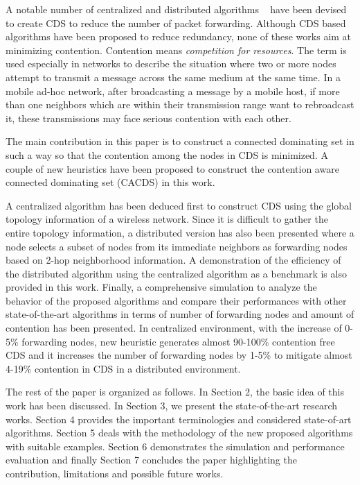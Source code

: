  A notable number of centralized and distributed algorithms ~\cite{yang2017routing, butenko2004new, luo2017new} have been devised to create CDS to reduce the number of packet forwarding. Although CDS based algorithms have been proposed to reduce redundancy, none of these works aim at minimizing contention. Contention means \textit{competition for resources}. The term is used especially in networks to describe the situation where two or more nodes attempt to transmit a message across the same medium at the same time. In a mobile ad-hoc network, after broadcasting a message by a mobile host, if more than one neighbors which are within their transmission range want to rebroadcast it, these transmissions may face serious contention with each other.
 
 The main contribution in this paper is to construct a connected dominating set in such a way so that the contention among the nodes in CDS is minimized. A couple of new heuristics have been proposed to construct the contention aware connected dominating set (CACDS) in this work. 
 
 A centralized algorithm has been deduced first to construct CDS using the global topology information of a wireless network. Since it is difficult to gather the entire topology information, a distributed version has also been presented where a node selects a subset of nodes from its immediate neighbors as forwarding nodes based on 2-hop neighborhood information. A demonstration of the efficiency of the distributed algorithm using the centralized algorithm as a benchmark is also provided in this work. Finally, a comprehensive simulation to analyze the behavior of the proposed algorithms and compare their performances with other state-of-the-art algorithms in terms of number of forwarding nodes and amount of contention has been presented. In centralized environment, with the increase of 0-5\% forwarding nodes, new heuristic generates almost 90-100\% contention free CDS and it increases the number of forwarding nodes by 1-5\% to mitigate almost 4-19\% contention in CDS in a distributed environment.

The rest of the paper is organized as follows. In Section 2, the basic idea of this work has been discussed. In Section 3, we present the state-of-the-art research works. Section 4 provides the important terminologies and considered state-of-art algorithms. Section 5 deals with the methodology of the new proposed algorithms with suitable examples. Section 6 demonstrates the simulation and performance evaluation and finally Section 7 concludes the paper highlighting the contribution, limitations  and possible future works.  


